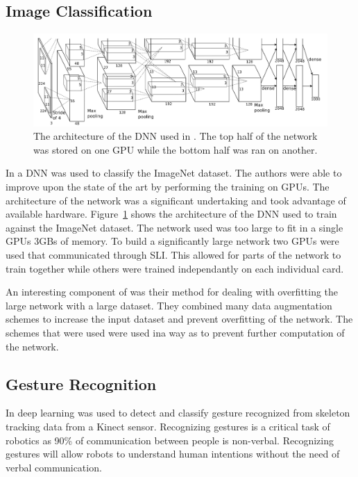 \documentclass[font=12pt]{article}
\begin{document}
\subsection{Image Classification}
\begin{figure}
\centering
\includegraphics[width=\textwidth]{imagenetarchitecture}
\caption{The architecture of the DNN used in \cite{krizhevsky2012imagenet}. The top half of the network was stored on one GPU while the bottom half was ran on another.}
\label{fig:imagenet}
\end{figure}
In \cite{krizhevsky2012imagenet} a DNN was used to classify the ImageNet\cite{deng2009imagenet} dataset. The authors were able to improve upon the state of the art by performing the training on GPUs. The architecture of the network was a significant undertaking and took advantage of available hardware. Figure~\ref{fig:imagenet} shows the architecture of the DNN used to train against the ImageNet dataset. The network used was too large to fit in a single GPUs 3GBs of memory. To build a significantly large network two GPUs were used that communicated through SLI. This allowed for parts of the network to train together while others were trained independantly on each individual card.

An interesting component of \cite{krizhevsky2012imagenet} was their method for dealing with overfitting the large network with a large dataset. They combined many data augmentation schemes to increase the input dataset and prevent overfitting of the network. The schemes that were used were used ina way as to prevent further computation of the network.
\subsection{Gesture Recognition}
In \cite{neverova2014multi} deep learning was used to detect and classify gesture recognized from skeleton tracking data from a Kinect sensor. Recognizing gestures is a critical task of robotics as 90\% of communication between people is non-verbal. Recognizing gestures will allow robots to understand human intentions without the need of verbal communication.
\end{document}
